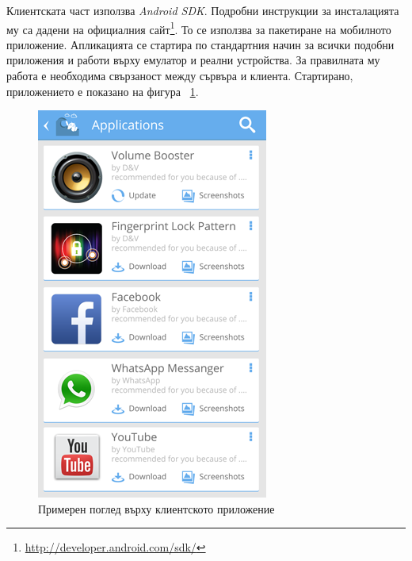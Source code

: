 	Клиентската част използва \emph{Android SDK}. Подробни инструкции за инсталацията му са дадени на официалния сайт\footnote{\url{http://developer.android.com/sdk/}}. То се използва за пакетиране на мобилното приложение. Апликацията се стартира по стандартния начин за всички подобни приложения и работи върху емулатор и реални устройства. За правилната му работа е необходима свързаност между сървъра и клиента. Стартирано, приложението е показано на фигура ~\ref{figure:client-recommendations}.

	\begin{figure}[htbp]
		\centering
 		\includegraphics{assets/tsunapper-app-recommendations.png}
		\caption{Примерен поглед върху клиентското приложение}
		\label{figure:client-recommendations}
	\end{figure}